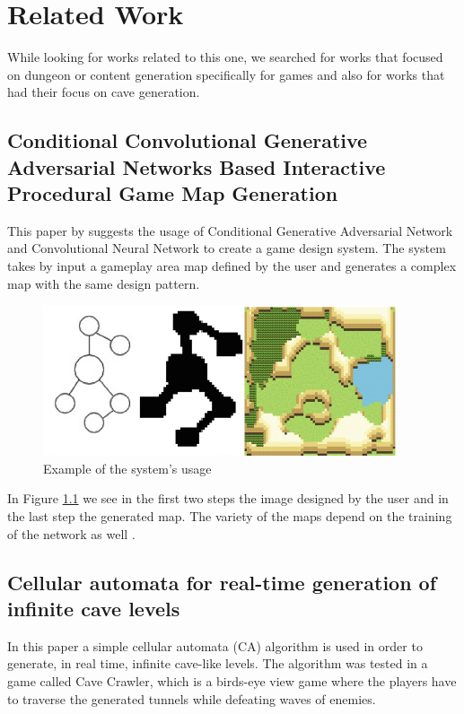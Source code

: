 \chapter{Related Work}
\label{chapter:related}

While looking for works related to this one, we searched for works that focused on dungeon or content generation specifically for games and also for works that had their focus on cave generation.

\section{Conditional Convolutional Generative
Adversarial Networks Based Interactive
Procedural Game Map Generation}

This paper by \citeauthor{ping:2020} suggests the usage of Conditional Generative Adversarial Network and Convolutional Neural Network to create a game design system. The system takes by input a gameplay area map defined by the user and generates a complex map with the same design pattern.

\begin{figure}[h]
    \caption{Example of the system's usage}
    \centerline{\includegraphics{images/related_work/ping.png}}
    \label{fig:ping}
\end{figure}
In Figure \ref{fig:ping} we see in the first two steps the image designed by the user and in the last step the generated map. The variety of the maps depend on the training of the network as well \citeyear{ping:2020}.

\section{Cellular automata for real-time generation
of infinite cave levels}

In this paper a simple cellular automata (CA) algorithm is used in order to generate, in real time, infinite cave-like levels. The algorithm was tested in a game called Cave Crawler, which is a birds-eye view game where the players have to traverse the generated tunnels while defeating waves of enemies. 

